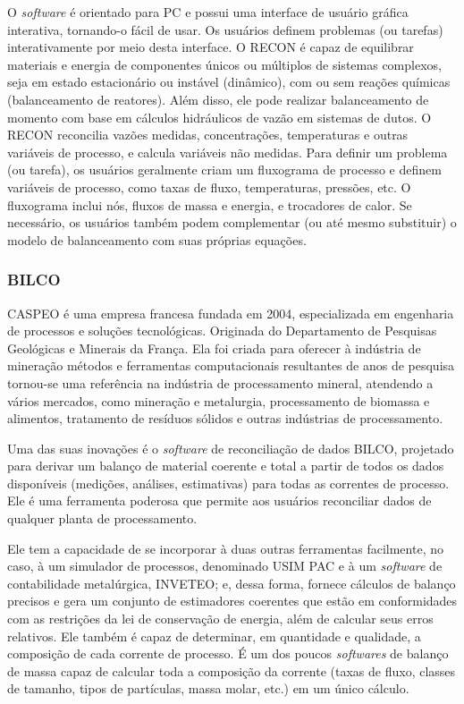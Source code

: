 O \textit{software} é orientado para PC e possui uma interface de usuário gráfica interativa, tornando-o fácil de usar. Os usuários definem problemas (ou tarefas) interativamente por meio desta interface. O RECON é capaz de equilibrar materiais e energia de componentes únicos ou múltiplos de sistemas complexos, seja em estado estacionário ou instável (dinâmico), com ou sem reações químicas (balanceamento de reatores). Além disso, ele pode realizar balanceamento de momento com base em cálculos hidráulicos de vazão em sistemas de dutos. O RECON reconcilia vazões medidas, concentrações, temperaturas e outras variáveis de processo, e calcula variáveis não medidas. Para definir um problema (ou tarefa), os usuários geralmente criam um fluxograma de processo e definem variáveis de processo, como taxas de fluxo, temperaturas, pressões, etc. O fluxograma inclui nós, fluxos de massa e energia, e trocadores de calor. Se necessário, os usuários também podem complementar (ou até mesmo substituir) o modelo de balanceamento com suas próprias equações.

\subsubsection{BILCO}

CASPEO é uma empresa francesa fundada em 2004, especializada em engenharia de processos e soluções tecnológicas. Originada do 
Departamento de Pesquisas Geológicas e Minerais da França. Ela foi criada para oferecer à indústria de mineração métodos e ferramentas computacionais resultantes de anos de pesquisa tornou-se uma referência na indústria de processamento mineral, atendendo a vários mercados, como mineração e metalurgia, processamento de biomassa e alimentos, tratamento de resíduos sólidos e outras indústrias de processamento. 

Uma das suas inovações é o \textit{software} de reconciliação de dados BILCO, projetado para derivar um balanço de material coerente e total a partir de todos os dados disponíveis (medições, análises, estimativas) para todas as correntes de processo. Ele é uma ferramenta poderosa que permite aos usuários reconciliar dados de qualquer planta de processamento.

Ele tem a capacidade de se incorporar à duas outras ferramentas facilmente, no caso, à um simulador de processos, denominado USIM PAC e à um \textit{software} de contabilidade metalúrgica, INVETEO; e, dessa forma, fornece cálculos de balanço precisos e gera um conjunto de estimadores coerentes que estão em conformidades com as restrições da lei de conservação de energia, além de calcular seus erros relativos. Ele também é capaz de determinar, em quantidade e qualidade, a composição de cada corrente de processo. É um dos poucos \textit{softwares} de balanço de massa capaz de calcular toda a composição da corrente (taxas de fluxo, classes de tamanho, tipos de partículas, massa molar, etc.) em um único cálculo.

